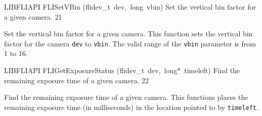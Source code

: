 \documentclass{article}
\begin{document}
\begin{cxxfunction}
{LIBFLIAPI}
        {FLISetVBin}
        {(flidev\_t\ dev,\ long\ vbin)}
        {
 Set the vertical bin factor for a given camera.}
        {21}
\begin{cxxdoc}

Set the vertical bin factor for a given camera.  This function sets
the vertical bin factor for the camera \texttt{dev} to
\texttt{vbin}.  The valid range of the \texttt{vbin} parameter is
from 1 to 16.


\end{cxxdoc}
\end{cxxfunction}
\begin{cxxfunction}
{LIBFLIAPI}
        {FLIGetExposureStatus}
        {(flidev\_t\ dev,\ long*\ timeleft)}
        {
 Find the remaining exposure time of a given camera.}
        {22}
\begin{cxxdoc}

Find the remaining exposure time of a given camera.  This functions
places the remaining exposure time (in milliseconds) in the
location pointed to by \texttt{timeleft}.


\end{cxxdoc}
\end{cxxfunction}
\end{document}
